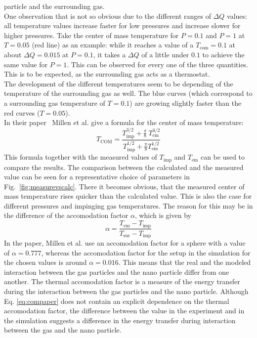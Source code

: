 \documentclass[12pt]{article}
\begin{document}
particle and the surrounding gas.\\
One observation that is not so obvious due to the different ranges of $\Delta Q$ values: all temperature values increase faster for low pressures and
increase slower for higher pressures. Take the center of mass temperature for $P=0.1$ and $P=1$ at $T=0.05$ (red line) as an example: while it reaches
a value of a $T_\text{com} = 0.1$ at about $\Delta Q = 0.015$ at $P=0.1$, it takes a $\Delta Q$ of a little under $0.1$ to achieve the same value
for $P = 1$.
This can be observed for every one of the three quantities. This is to be expected, as the surrounding gas acts as a thermostat. \\
The development of the different temperatures seem to be depending of the temperature of the surrounding gas as well. The blue curves (which
correspond to a surrounding gas temperature of $T=0.1$) are growing slightly faster than the red curves ($T=0.05$).\\
In their paper~\cite{MillenJ.2014} Millen et al. give a formula for the center of mass temperature:
\begin{equation}
    \label{eq:compaper}
    T_\text{COM} = \frac{T_\text{imp}^{3/2}+\tfrac\pi 8 \ T_\text{em}^{3/2}}{T_\text{imp}^{1/2}+\tfrac\pi8 T_\text{em}^{1/2}}
\end{equation}
This formula together with the measured values of $T_\text{imp}$ and $T_\text{em}$ can be used to compare the results. The comparison between the
calculated and the measured value can be seen for a representative choice of parameters in Fig.~\ref{fig:measurevscalc}. There it becomes obvious,
that the measured center of mass temperature rises quicker than the calculated value. This is also the case for different pressures and impinging gas
temperatures. The reason for this may be in the difference of the accomodation factor $\alpha$, which is given by~\cite{Goodman1980}
\begin{equation}
    \alpha = \frac{T_\text{em} - T_\text{imp}}{T_\text{sur} - T_\text{imp}}
\end{equation}
In the paper, Millen et al. use an accomodation factor
for a sphere with a value of $\alpha = 0.777$, whereas the accomodation factor for the setup in the simulation for the chosen values is around
$\alpha = 0.016$. This means that the real and the modeled interaction between the gas particles and the nano particle differ from one another.
The thermal accomodation factor is a measure of the energy transfer during the interaction between the gas particles and the nano particle. Although Eq.
\eqref{eq:compaper} does not contain an explicit dependence on the thermal accomodation factor, the difference between the value in the experiment and
in the simulation suggests a difference in the energy transfer during interaction between the gas and the nano particle.
\end{document}
